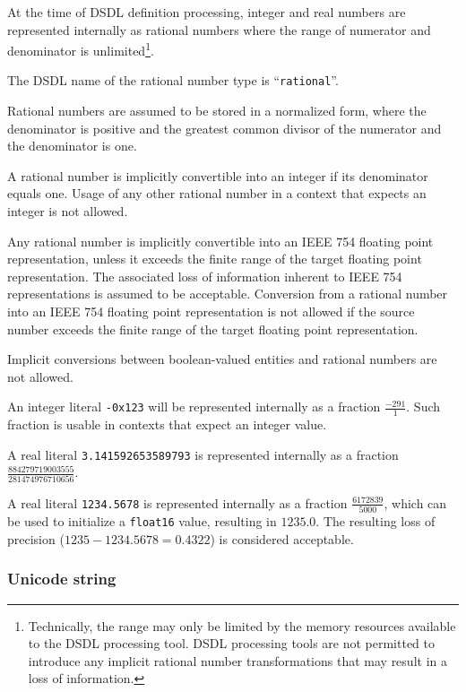 At the time of DSDL definition processing, integer and real numbers are represented internally as rational numbers
where the range of numerator and denominator is unlimited\footnote{%
Technically, the range may only be limited by the memory resources available to the DSDL processing tool.
DSDL processing tools are not permitted to introduce any implicit rational number transformations that
may result in a loss of information.}.

The DSDL name of the rational number type is ``\verb|rational|''.

Rational numbers are assumed to be stored in a normalized form, where the denominator is positive
and the greatest common divisor of the numerator and the denominator is one.

A rational number is implicitly convertible into an integer if its denominator equals one.
Usage of any other rational number in a context that expects an integer is not allowed.

Any rational number is implicitly convertible into an IEEE 754 floating point representation,
unless it exceeds the finite range of the target floating point representation.
The associated loss of information inherent to IEEE 754 representations is assumed to be acceptable.
Conversion from a rational number into an IEEE 754 floating point representation
is not allowed if the source number exceeds the finite range of the target floating point representation.

Implicit conversions between boolean-valued entities and rational numbers are not allowed.

\begin{remark}
    An integer literal \verb|-0x123| will be represented internally as a fraction $\frac{-291}{1}$.
    Such fraction is usable in contexts that expect an integer value.

    A real literal \verb|3.141592653589793| is represented internally as a fraction
    $\frac{884279719003555}{281474976710656}$.

    A real literal \verb|1234.5678| is represented internally as a fraction
    $\frac{6172839}{5000}$, which can be used to initialize a \verb|float16| value,
    resulting in $1235.0$.
    The resulting loss of precision ($1235 - 1234.5678 = 0.4322$) is considered acceptable.
\end{remark}

\subsubsection{Unicode string}

